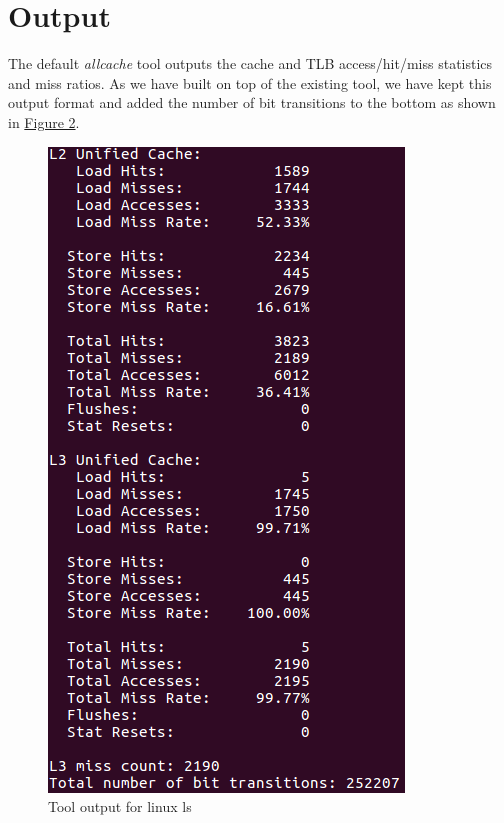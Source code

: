 \documentclass[a4paper,12pt]{article}
\begin{document}
\section{Output}
The default \emph{allcache} tool outputs the cache and TLB access/hit/miss statistics and miss ratios. As we have built on top of the existing tool, we have kept this output format and added the number of bit transitions to the bottom as shown in \hyperref[fig_2]{Figure 2}.

\begin{figure}[h]
		\label{fig_2}
		\centering
		\includegraphics[scale=1]{output_1.png}
		\caption{Tool output for linux ls}
\end{figure}
\end{document}
